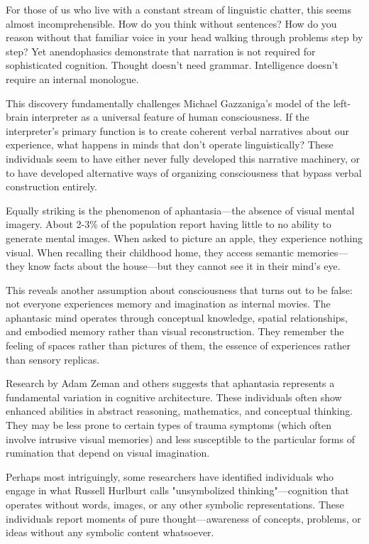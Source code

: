 For those of us who live with a constant stream of linguistic chatter, this seems almost incomprehensible. How do you think without sentences? How do you reason without that familiar voice in your head walking through problems step by step? Yet anendophasics demonstrate that narration is not required for sophisticated cognition. Thought doesn't need grammar. Intelligence doesn't require an internal monologue.

This discovery fundamentally challenges Michael Gazzaniga's model of the left-brain interpreter as a universal feature of human consciousness. If the interpreter's primary function is to create coherent verbal narratives about our experience, what happens in minds that don't operate linguistically? These individuals seem to have either never fully developed this narrative machinery, or to have developed alternative ways of organizing consciousness that bypass verbal construction entirely.

Equally striking is the phenomenon of aphantasia—the absence of visual mental imagery. About 2-3\% of the population report having little to no ability to generate mental images. When asked to picture an apple, they experience nothing visual. When recalling their childhood home, they access semantic memories—they know facts about the house—but they cannot see it in their mind's eye.

This reveals another assumption about consciousness that turns out to be false: not everyone experiences memory and imagination as internal movies. The aphantasic mind operates through conceptual knowledge, spatial relationships, and embodied memory rather than visual reconstruction. They remember the feeling of spaces rather than pictures of them, the essence of experiences rather than sensory replicas.

Research by Adam Zeman and others suggests that aphantasia represents a fundamental variation in cognitive architecture. These individuals often show enhanced abilities in abstract reasoning, mathematics, and conceptual thinking. They may be less prone to certain types of trauma symptoms (which often involve intrusive visual memories) and less susceptible to the particular forms of rumination that depend on visual imagination.

Perhaps most intriguingly, some researchers have identified individuals who engage in what Russell Hurlburt calls "unsymbolized thinking"—cognition that operates without words, images, or any other symbolic representations. These individuals report moments of pure thought—awareness of concepts, problems, or ideas without any symbolic content whatsoever.

